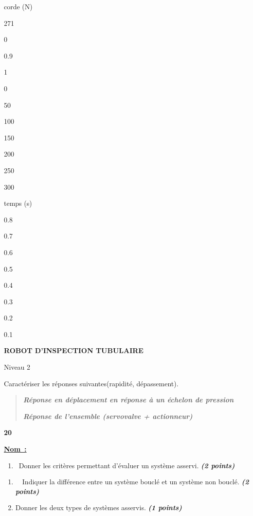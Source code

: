 corde (N)

271

0

0.9

1

0

50

100

150

200

250

300

temps (s)

0.8

0.7

0.6

0.5

0.4

0.3

0.2

0.1

\textbf{ROBOT D'INSPECTION TUBULAIRE}

Niveau 2

Caractériser les réponses suivantes(rapidité, dépassement).


\begin{quote}
\emph{\textbf{Réponse en déplacement en réponse à un échelon de
pression}}


\emph{\textbf{Réponse de l'ensemble (servovalve + actionneur)}}
\end{quote}

\textbf{20}

\textbf{\ul{Nom~:}}

\begin{enumerate}
\def\labelenumi{\arabic{enumi}.}
\item
  ~Donner les critères permettant d'évaluer un système asservi.
  \emph{\textbf{(2 points)}}
\end{enumerate}

\begin{enumerate}
\def\labelenumi{\arabic{enumi}.}
\item
  ~~Indiquer la différence entre un système bouclé et un système non
  bouclé. \emph{\textbf{(2 points)}}
\item
  Donner les deux types de systèmes asservis. \emph{\textbf{(1 points)}}
\end{enumerate}

